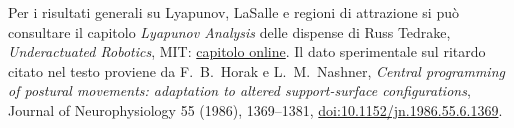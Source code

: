 \documentclass[11pt]{article}
\begin{document}
Per i risultati generali su Lyapunov, LaSalle e regioni di attrazione si può consultare il capitolo \emph{Lyapunov Analysis} delle dispense di Russ Tedrake, \emph{Underactuated Robotics}, MIT: \href{https://underactuated.mit.edu/lyapunov.html}{capitolo online}. Il dato sperimentale sul ritardo citato nel testo proviene da F.~B.~Horak e L.~M.~Nashner, \emph{Central programming of postural movements: adaptation to altered support-surface configurations}, Journal of Neurophysiology 55 (1986), 1369--1381, \href{https://doi.org/10.1152/jn.1986.55.6.1369}{doi:10.1152/jn.1986.55.6.1369}.
\end{document}
